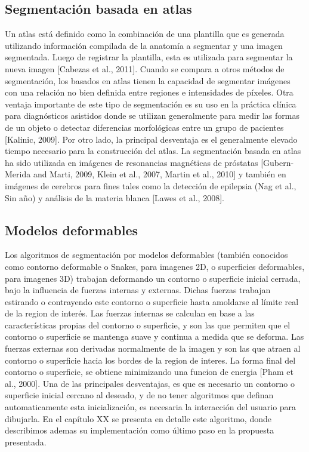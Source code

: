 \subsection{Segmentación basada en atlas}
Un atlas está definido como la combinación de una plantilla que es generada utilizando información compilada de la anatomía a segmentar y una imagen segmentada. Luego de registrar la plantilla, esta es utilizada para segmentar la nueva imagen [Cabezas et al., 2011]. Cuando se compara a otros métodos de segmentación, los basados en atlas tienen la capacidad de segmentar imágenes con una relación no bien definida entre regiones e intensidades de píxeles. Otra ventaja importante de este tipo de segmentación es su uso en la práctica clínica para diagnósticos asistidos donde se utilizan generalmente para medir las formas de un objeto o detectar diferencias morfológicas entre un grupo de pacientes [Kalinic, 2009]. Por otro lado, la principal desventaja es el generalmente elevado tiempo necesario para la construcción del atlas. 
La segmentación basada en atlas ha sido utilizada en imágenes de resonancias magnéticas de próstatas [Gubern-Merida and Marti, 2009, Klein et al., 2007, Martin et al., 2010] y también en imágenes de cerebros para fines tales como la detección de epilepsia (Nag et al., Sin año) y análisis de la materia blanca [Lawes et al., 2008].

\subsection{Modelos deformables}
Los algoritmos de segmentación por modelos deformables (también conocidos como contorno deformable o Snakes, para imagenes 2D, o superficies deformables, para imagenes 3D) trabajan deformando un contorno o superficie inicial cerrada, bajo la influencia de fuerzas internas y externas. Dichas fuerzas trabajan estirando o contrayendo este contorno o superficie hasta amoldarse al límite real de la region de interés.
Las fuerzas internas se calculan en base a las características propias del contorno o superficie, y son las que permiten que el contorno o superficie se mantenga suave y continua a medida que se deforma.  Las fuerzas externas son derivadas normalmente de la imagen y son las que atraen al contorno o superficie hacia los bordes de la region de interes. La forma final del contorno o superficie, se obtiene minimizando una funcion de energia [Pham et al., 2000]. Una de las principales desventajas, es que es necesario un contorno o superficie inicial cercano al deseado, y de no tener algoritmos que definan automaticamente esta inicialización, es necesaria la interacción del usuario para dibujarla.
En el capítulo XX se presenta en detalle este algoritmo, donde describimos ademas su implementación como último paso en la propuesta presentada.
